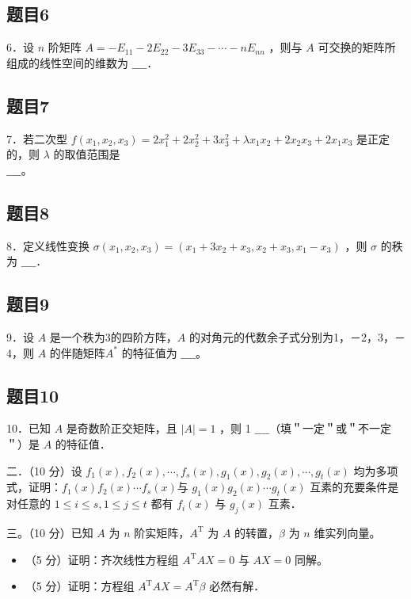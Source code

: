 \documentclass{article}
\begin{document}
\subsection{题目6}
6．设 \(n\) 阶矩阵 \(A=-E_{11}-2 E_{22}-3 E_{33}-\cdots-n E_{n n}\) ，则与 \(A\) 可交换的矩阵所组成的线性空间的维数为 \(\_\_\_\_\)．

\subsection{题目7}
7．若二次型 \(f\left(x_{1}, x_{2}, x_{3}\right)=2 x_{1}^{2}+2 x_{2}^{2}+3 x_{3}^{2}+\lambda x_{1} x_{2}+2 x_{2} x_{3}+2 x_{1} x_{3}\) 是正定的，则 \(\lambda\) 的取值范围是\\
\(\_\_\_\_\)。

\subsection{题目8}
8．定义线性变换 \(\sigma\left(x_{1}, x_{2}, x_{3}\right)=\left(x_{1}+3 x_{2}+x_{3}, x_{2}+x_{3}, x_{1}-x_{3}\right)\) ，则 \(\sigma\) 的秩为 \(\_\_\_\_\)．

\subsection{题目9}
9．设 \(A\) 是一个秩为3的四阶方阵，\(A\) 的对角元的代数余子式分别为1，－2，3，－4，则 \(A\) 的伴随矩阵\(A^{*}\) 的特征值为 \(\_\_\_\_\)。

\subsection{题目10}
10．已知 \(A\) 是奇数阶正交矩阵，且 \(|A|=1\) ，则 1 \(\_\_\_\_\)（填＂一定＂或＂不一定＂）是 \(A\) 的特征值．

二．（10 分）设 \(f_{1}(x), f_{2}(x), \cdots, f_{s}(x), g_{1}(x), g_{2}(x), \cdots, g_{t}(x)\) 均为多项式，证明：\(f_{1}(x) f_{2}(x) \cdots f_{s}(x)\)与 \(g_{1}(x) g_{2}(x) \cdots g_{t}(x)\) 互素的充要条件是对任意的 \(1 \leq i \leq s, 1 \leq j \leq t\) 都有 \(f_{i}(x)\) 与 \(g_{j}(x)\) 互素．

三。（10 分）已知 \(A\) 为 \(n\) 阶实矩阵，\(A^{\mathrm{T}}\) 为 \(A\) 的转置，\(\beta\) 为 \(n\) 维实列向量。

\begin{itemize}
  \item[（1）] （5 分）证明：齐次线性方程组 \(A^{\mathrm{T}} A X=0\) 与 \(A X=0\) 同解。
  \item[（2）] （5 分）证明：方程组 \(A^{\mathrm{T}} A X=A^{\mathrm{T}} \beta\) 必然有解．
\end{itemize}
\end{document}

